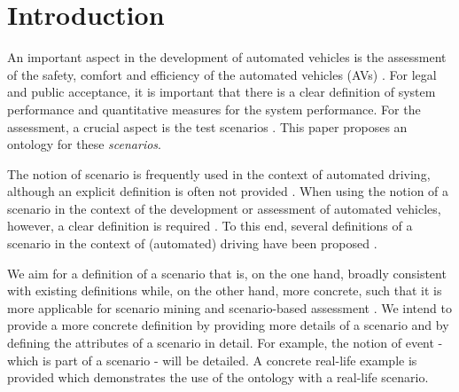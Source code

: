 \section{Introduction}
\label{sec:introduction}

An important aspect in the development of automated vehicles is the assessment of the safety, comfort and efficiency of the automated vehicles (AVs) \cite{bengler2014threedecades, stellet2015taxonomy, Helmer2017safety, putz2017pegasus, roesener2017comprehensive, gietelink2006development}. For legal and public acceptance, it is important that there is a clear definition of system performance and quantitative measures for the system performance. For the assessment, a crucial aspect is the test scenarios \cite{stellet2015taxonomy}. This paper proposes an ontology for these \emph{scenarios}.

The notion of scenario is frequently used in the context of automated driving, although an explicit definition is often not provided \cite{putz2017pegasus, roesener2017comprehensive, gietelink2006development, hulshof2013autonomous, karaduman2013interactivebehavior, englund2016grand, xu2002effects, ebner2011identifying, ploeg2017GCDC, zofka2015datadrivetrafficscenarios}. When using the notion of a scenario in the context of the development or assessment of automated vehicles, however, a clear definition is required \cite{stellet2015taxonomy, Helmer2017safety, alvarez2017prospective, zofka2015datadrivetrafficscenarios, aparicio2013pre, lesemann2011test, putz2017pegasus, geyer2014, ulbrich2015}. To this end, several definitions of a scenario in the context of (automated) driving have been proposed \cite{geyer2014, ulbrich2015, elrofai2016scenario}.

We aim for a definition of a scenario that is, on the one hand, broadly consistent with existing definitions \cite{geyer2014, ulbrich2015, elrofai2016scenario} while, on the other hand, more concrete, such that it is more applicable for scenario mining \cite{elrofai2016scenario} and scenario-based assessment \cite{stellet2015taxonomy, deGelder2017assessment}. We intend to provide a more concrete definition by providing more details of a scenario and by defining the attributes of a scenario in detail. For example, the notion of event - which is part of a scenario - will be detailed. A concrete real-life example is provided which demonstrates the use of the ontology with a real-life scenario.

